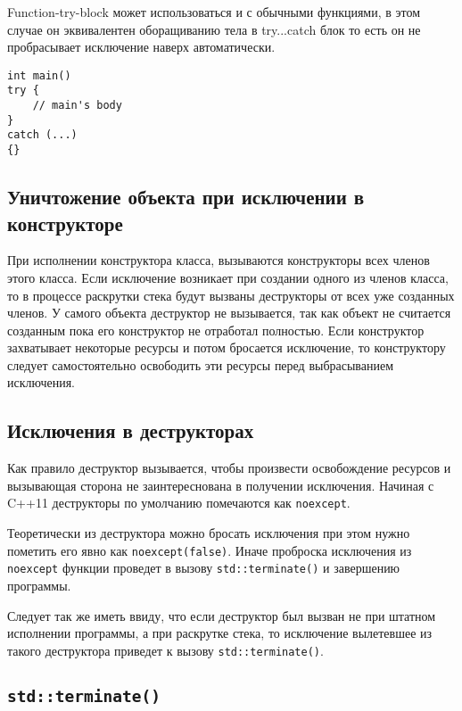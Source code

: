 Function-try-block может использоваться и с обычными функциями, в этом случае он эквивалентен оборащиванию тела в try...catch блок то есть он не пробрасывает исключение наверх автоматически.

\begin{verbatim}
int main()
try {
    // main's body
}
catch (...)
{}
\end{verbatim}

\subsection{Уничтожение объекта при исключении в конструкторе}

При исполнении конструктора класса, вызываются конструкторы всех членов этого класса. Если исключение возникает при создании одного из членов класса, то в процессе раскрутки стека будут вызваны деструкторы от всех уже созданных членов. У самого объекта деструктор не вызывается, так как объект не считается созданным пока его конструктор не отработал полностью. Если конструктор захватывает некоторые ресурсы и потом бросается исключение, то конструктору следует самостоятельно освободить эти ресурсы перед выбрасыванием исключения.

\subsection{Исключения в деструкторах}

Как правило деструктор вызывается, чтобы произвести освобождение ресурсов и вызывающая сторона не заинтереснована в получении исключения. Начиная с C++11 деструкторы по умолчанию помечаются как \texttt{noexcept}.

Теоретически из деструктора можно бросать исключения при этом нужно пометить его явно как \texttt{noexcept(false)}. Иначе проброска исключения из \texttt{noexcept} функции проведет в вызову \texttt{std::terminate()} и завершению программы.

Следует так же иметь ввиду, что если деструктор был вызван не при штатном исполнении программы, а при раскрутке стека, то исключение вылетевшее из такого деструктора приведет к вызову \texttt{std::terminate()}.

\subsection{\texttt{std::terminate()}}

